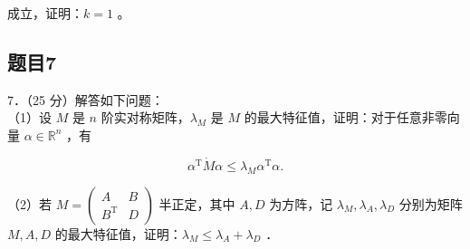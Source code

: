 \documentclass{article}
\begin{document}
成立，证明：\(k=1\) 。

\subsection{题目7}
7．（25 分）解答如下问题：\\
（1）设 \(M\) 是 \(n\) 阶实对称矩阵，\(\lambda_{M}\) 是 \(M\) 的最大特征值，证明：对于任意非零向量 \(\alpha \in \mathbb{R}^{n}\) ，有

\[
\alpha^{\mathrm{T}} \dot{M} \alpha \leq \lambda_{M} \alpha^{\mathrm{T}} \alpha .
\]

（2）若 \(M=\left(\begin{array}{cc}A & B \\ B^{\mathrm{T}} & D\end{array}\right)\) 半正定，其中 \(A, D\) 为方阵，记 \(\lambda_{M}, \lambda_{A}, \lambda_{D}\) 分别为矩阵 \(M, A, D\) 的最大特征值，证明：\(\lambda_{M} \leq \lambda_{A}+\lambda_{D}\) ．
\end{document}
